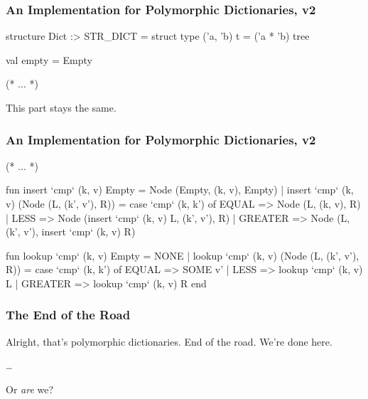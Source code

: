 \documentclass[aspectratio=169, handout]{beamer}
\begin{document}
\begin{frame}[fragile]
  \frametitle{An Implementation for Polymorphic Dictionaries, v2}

  \begin{codeblock}
    structure Dict :> STR_DICT =
      struct
        type ('a, 'b) t = ('a * 'b) tree

        val empty = Empty

        (* ... *)
  \end{codeblock}

  \vspace{\fill}

  This part stays the same.
\end{frame}

\begin{frame}[fragile]
  \frametitle{An Implementation for Polymorphic Dictionaries, v2}
  \small
  \begin{codeblock}
    (* ... *)

      fun insert `cmp` (k, v) Empty = Node (Empty, (k, v), Empty)
        | insert `cmp` (k, v) (Node (L, (k', v'), R)) =
            case `cmp` (k, k') of
              EQUAL   => Node (L, (k, v), R)
            | LESS    => Node (insert `cmp` (k, v) L, (k', v'), R)
            | GREATER => Node (L, (k', v'), insert `cmp` (k, v) R)

      fun lookup `cmp` (k, v) Empty = NONE
        | lookup `cmp` (k, v) (Node (L, (k', v'), R)) =
            case `cmp` (k, k') of
              EQUAL   => SOME v'
            | LESS    => lookup `cmp` (k, v) L
            | GREATER => lookup `cmp` (k, v) R
    end
  \end{codeblock}
\end{frame}

\begin{frame}[fragile]
  \frametitle{The End of the Road}

  Alright, that's polymorphic dictionaries. End of the road. We're done here.

  \pause
  \vspace{\fill}

  \dots

  \pause
  \vspace{\fill}

  Or \textit{are} we?
\end{frame}
\end{document}
